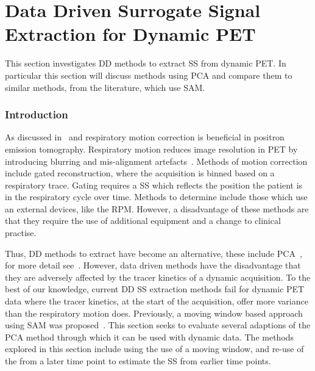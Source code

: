 \chapter{Data Driven Surrogate Signal Extraction for Dynamic PET} \label{sec:data_driven_surrogate_signal_extraction_results}
    \newpage
    
        
    
        This section investigates \gls{DD} methods to extract \gls{SS} from dynamic \gls{PET}. In particular this section will discuss methods using \gls{PCA} and compare them to similar methods, from the literature, which use \gls{SAM}.
        
        \subsection{Introduction} \label{sec:pca_data_driven_surrogate_signal_extraction_methods_for_dynamic_pet_introduction}
            As discussed in~ and  respiratory motion correction is beneficial in positron emission tomography. Respiratory motion reduces image resolution in \gls{PET} by introducing blurring and mis-alignment artefacts~. Methods of motion correction include gated reconstruction, where the acquisition is binned based on a respiratory trace. Gating requires a \gls{SS} which reflects the position the patient is in the respiratory cycle over time. Methods to determine  include those which use an external devices, like the \gls{RPM}. However, a disadvantage of these methods are that they require the use of additional equipment and a change to clinical practise.
            
            Thus, \gls{DD} methods to extract  have become an alternative, these include \gls{PCA}~, for more detail see~. However, data driven methods have the disadvantage that they are adversely affected by the tracer kinetics of a dynamic acquisition. To the best of our knowledge, current \gls{DD} \gls{SS} extraction methods fail for dynamic \gls{PET} data where the tracer kinetics, at the start of the acquisition, offer more variance than the respiratory motion does. Previously, a moving window based approach using \gls{SAM} was proposed~. This section seeks to evaluate several adaptions of the \gls{PCA} method through which it can be used with dynamic data. The methods explored in this section include using the use of a moving window, and re-use of the  from a later time point to estimate the \gls{SS} from earlier time points.
        
